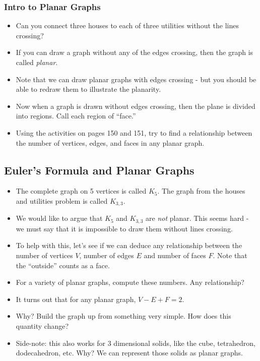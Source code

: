 \subsubsection*{Intro to Planar Graphs}
\begin{itemize}
  \item Can you connect three houses to each of three utilities without the lines crossing?  
  \item If you can draw a graph without any of the edges crossing, then the graph is called {\em planar}.
  \item Note that we can draw planar graphs with edges crossing - but you should be able to redraw them to illustrate the planarity.
  \item Now when a graph is drawn without edges crossing, then the plane is divided into regions.  Call each region of ``face.''
  \item Using the activities on pages 150 and 151, try to find a relationship between the number of vertices, edges, and faces in any planar graph.
\end{itemize}



\subsection*{Euler's Formula and Planar Graphs}
\begin{itemize}
\item The complete graph on 5 vertices is called $K_5$.  The graph from the houses and utilities problem is called $K_{3,3}$.
\item We would like to argue that $K_5$ and $K_{3,3}$ are {\em not} planar.  This seems hard - we must say that it is impossible to draw them without lines crossing.
 \item To help with this, let's see if we can deduce any relationship between the number of vertices $V$, number of edges $E$ and number of faces $F$.  Note that the ``outside'' counts as a face.
 \item For a variety of planar graphs, compute these numbers.  Any relationship?
 \item It turns out that for any planar graph, $V - E + F = 2$.
 \item Why?  Build the graph up from something very simple.  How does this quantity change?
 \item Side-note: this also works for 3 dimensional solids, like the cube, tetrahedron, dodecahedron, etc.  Why?  We can represent those solids as planar graphs.
\end{itemize}

